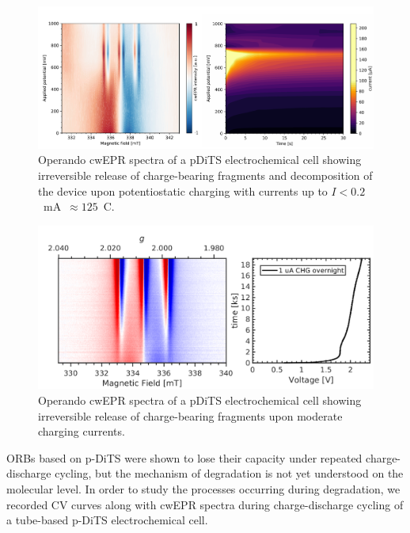\begin{figure}[!h]
\center
	\includegraphics[width=1\textwidth]{./operando_epr/figures/degradation/overnight_dits_201211_full_redox_contour_XY.pdf}
	\caption{Operando cwEPR spectra of a pDiTS electrochemical cell showing irreversible release of charge-bearing fragments and decomposition of the device upon potentiostatic charging with currents up to $I<0.2$~mA~$\approx125$~C.}
	\label{fig:operando_degradation_device}
\end{figure}


\begin{figure}[!h]
\center
	\includegraphics[width=1\textwidth]{./operando_epr/figures/degradation/pDiTS_slow_charge_MS5000_forslides.png}
	\caption{Operando cwEPR spectra of a pDiTS electrochemical cell showing irreversible release of charge-bearing fragments upon moderate charging currents.}
	\label{fig:operando_degradation_3_lines_release}
\end{figure}



\par
ORBs based on p-DiTS were shown to lose their capacity under repeated charge-discharge cycling,\cite{vereshchagin2020} but the mechanism of degradation is not yet understood on the molecular level. In order to study the processes occurring during degradation, we recorded CV curves along with cwEPR spectra during charge-discharge cycling of a tube-based p-DiTS electrochemical cell.

